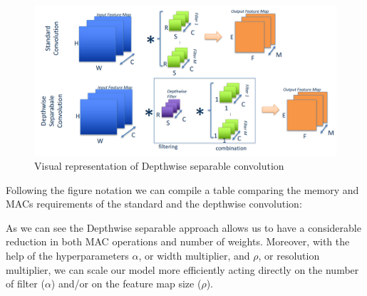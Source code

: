 \documentclass{article}
\begin{document}
        \begin{figure}[H]
          \includegraphics[scale=0.4]{../Images/DWConv.png}
          \centering
          \caption{Visual representation of Depthwise separable convolution}
        \end{figure}

        Following the figure notation we can compile a table comparing the memory and MACs requirements of the standard and the depthwise convolution:

        \begin{table}[H]
          \centering
          \caption{Comparison between types of convolution}
        \end{table}

        As we can see the Depthwise separable approach allows us to have a considerable reduction in both MAC operations and number of weights. Moreover, with the help of the hyperparameters $\alpha$, or width multiplier, and $\rho$, or resolution multiplier, we can scale
        our model more efficiently acting directly on the number of filter ($\alpha$) and/or on the feature map size ($\rho$).
\end{document}

